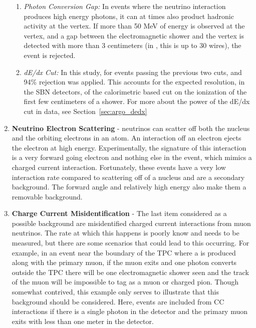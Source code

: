 \begin{enumerate}
\begin{enumerate}
    \item{\em Photon Conversion Gap:} In events where the neutrino interaction produces high energy photons, it can at times also product hadronic activity at the vertex.  If more than 50 MeV of energy is observed at the vertex, and a gap between the electromagnetic shower and the vertex is detected with more than 3 centimeters (in \uboone, this is up to 30 wires), the event is rejected.

    \item{\em dE/dx Cut:} In this study, for events passing the previous two cuts, and 94\% rejection was applied.  This accounts for the expected resolution, in the SBN detectors, of the calorimetric based cut on the ionization of the first few centimeters of a shower.  For more about the power of the dE/dx cut in data, see Section~\ref{sec:argo_dedx}

  \end{enumerate}


  \item {\bf Neutrino Electron Scattering}  - neutrinos can scatter off both the nucleus and the orbiting electrons in an atom. An interaction off an electron ejects the electron at high energy. Experimentally, the signature of this interaction is a very forward going electron and nothing else in the event, which mimics a \nue charged current interaction. Fortunately, these events have a very low interaction rate compared to scattering off of a nucleus and are a secondary background.  The forward angle and relatively high energy also make them a removable background.

  \item {\bf \numu Charge Current Misidentification} - The last item considered as a possible background are misidentified charged current interactions from muon neutrinos. The rate at which this happens is poorly know and needs to be measured, but there are some scenarios that could lead to this occurring. For example, in an event near the boundary of the TPC where a \pizero is produced along with the primary muon, if the muon exits and one photon converts outside the TPC there will be one electromagnetic shower seen and the track of the muon will be impossible to tag as a muon or charged pion. Though somewhat contrived, this example only serves to illustrate that this background should be considered. Here, events are included from \numu CC interactions if there is a single photon in the detector and the primary muon exits with less than one meter in the detector.
  

\end{enumerate}
